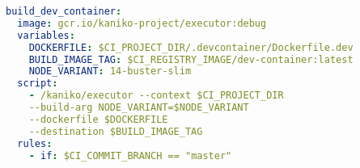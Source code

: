 
\begin{lstlisting}[language=yml,caption={GitLab \ac{CI} Build-File for Docker Images},breaklines=true,label={code::ci_build_yml}]
build_dev_container:
  image: gcr.io/kaniko-project/executor:debug
  variables:
    DOCKERFILE: $CI_PROJECT_DIR/.devcontainer/Dockerfile.dev
    BUILD_IMAGE_TAG: $CI_REGISTRY_IMAGE/dev-container:latest
    NODE_VARIANT: 14-buster-slim
  script:
    - /kaniko/executor --context $CI_PROJECT_DIR
    --build-arg NODE_VARIANT=$NODE_VARIANT
    --dockerfile $DOCKERFILE
    --destination $BUILD_IMAGE_TAG
  rules:
    - if: $CI_COMMIT_BRANCH == "master"

\end{lstlisting}
